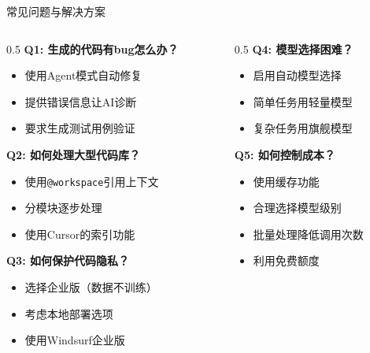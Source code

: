 \documentclass[aspectratio=169,11pt]{beamer}
\begin{document}
\begin{frame}{常见问题与解决方案}
    \begin{columns}
        \begin{column}{0.5\textwidth}
            \textbf{Q1: 生成的代码有bug怎么办？}
            \begin{itemize}
                \item 使用Agent模式自动修复
                \item 提供错误信息让AI诊断
                \item 要求生成测试用例验证
            \end{itemize}
            
            \vspace{0.3cm}
            \textbf{Q2: 如何处理大型代码库？}
            \begin{itemize}
                \item 使用\texttt{@workspace}引用上下文
                \item 分模块逐步处理
                \item 使用Cursor的索引功能
            \end{itemize}
            
            \vspace{0.3cm}
            \textbf{Q3: 如何保护代码隐私？}
            \begin{itemize}
                \item 选择企业版（数据不训练）
                \item 考虑本地部署选项
                \item 使用Windsurf企业版
            \end{itemize}
        \end{column}
        \begin{column}{0.5\textwidth}
            \textbf{Q4: 模型选择困难？}
            \begin{itemize}
                \item 启用自动模型选择
                \item 简单任务用轻量模型
                \item 复杂任务用旗舰模型
            \end{itemize}
            
            \vspace{0.3cm}
            \textbf{Q5: 如何控制成本？}
            \begin{itemize}
                \item 使用缓存功能
                \item 合理选择模型级别
                \item 批量处理降低调用次数
                \item 利用免费额度
            \end{itemize}
            

\end{column}
\end{columns}
\end{frame}
\end{document}
